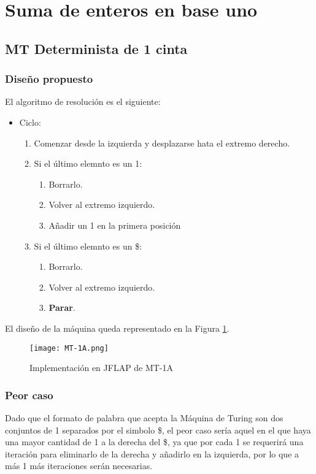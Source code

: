 \section{Suma de enteros en base uno}

\subsection{MT Determinista de 1 cinta}

\subsubsection*{Diseño propuesto}
El algoritmo de resolución es el siguiente:

\begin{itemize}
    \item Ciclo:
    \begin{enumerate}[1.]
        \item Comenzar desde la izquierda y desplazarse hata el extremo derecho.
        \item Si el último elemnto es un 1:
        \begin{enumerate}[1.]
            \item Borrarlo.
            \item Volver al extremo izquierdo.
            \item Añadir un 1 en la primera posición
        \end{enumerate}
        \item Si el último elemnto es un \$:
        \begin{enumerate}[1.]
            \item Borrarlo.
            \item Volver al extremo izquierdo.
            \item \textbf{Parar}.
        \end{enumerate}
    \end{enumerate}
\end{itemize}

El diseño de la máquina queda representado en la Figura \ref{fig:MT-1A}.

\begin{figure}[h]
    \texttt{[image: MT-1A.png]}
    \caption{Implementación en JFLAP de MT-1A}
    \label{fig:MT-1A}
\end{figure}


\subsubsection*{Peor caso}
Dado que el formato de palabra que acepta la Máquina de Turing son dos conjuntos de 1 separados por el simbolo \$, el peor caso sería aquel en el que haya una mayor cantidad de 1 a la derecha del \$, ya que por cada 1 se requerirá una iteración para eliminarlo de la derecha y añadirlo en la izquierda, por lo que a más 1 más iteraciones serán necesarias.

